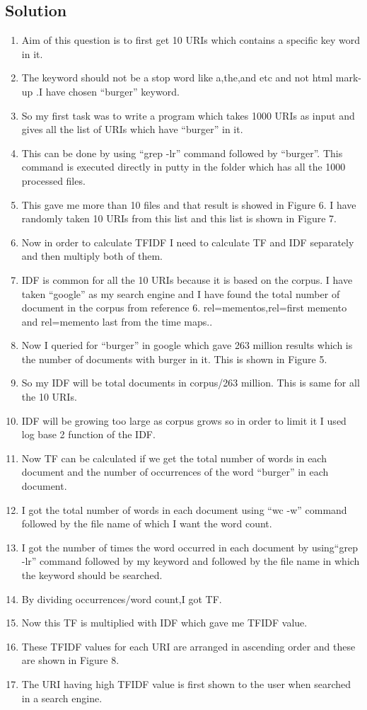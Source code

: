 \subsection{Solution}
\begin{enumerate}
\item Aim of this question is to first get 10 URIs which contains a specific key word in it. 
\item The keyword should not be a stop word like a,the,and etc and not html mark-up .I have chosen ``burger'' keyword.
\item So my first task was to write a program which takes 1000 URIs as input and gives all the list of URIs which have ``burger'' in it.
\item This can be done by using ``grep -lr'' command followed by ``burger''. This command is executed directly in putty in the folder which has all the 1000 processed files.
\item This gave me more than 10 files and that result is showed in Figure 6. I have randomly taken 10 URIs from this list and this list is shown in Figure 7.
\item Now in order to calculate TFIDF I need to calculate TF and IDF separately and then multiply both of them.
\item IDF is common for all the 10 URIs because it is based on the corpus. I have taken ``google'' as my search engine and I have found the total number of document in the corpus from reference 6. rel=mementos,rel=first memento and rel=memento last from the time maps..
\item Now I queried for ``burger'' in google which gave 263 million results which is the number of documents with burger in it. This is shown in Figure 5.
\item So my IDF will be total documents in corpus/263 million. This is same for all the 10 URIs.
\item IDF will be growing too large as corpus grows so in order to limit it I used log base 2 function of the IDF.  
\item Now TF can be calculated if we get the total number of words in each document and the number of occurrences of the word ``burger'' in each document.
\item I got the total number of words in each document using ``wc -w'' command followed by the file name of which I want the word count.
\item I got the number of times the word occurred in each document by using``grep -lr'' command followed by my keyword and followed by the file name in which the keyword should be searched.
\item By dividing occurrences/word count,I got TF. 
\item Now this TF is multiplied with IDF which gave me TFIDF value.
\item These TFIDF values for each URI are arranged in ascending order and these are shown in Figure 8.
\item The URI having high TFIDF value is first shown to the user when searched in a search engine.
  
\end{enumerate}
\newpage
